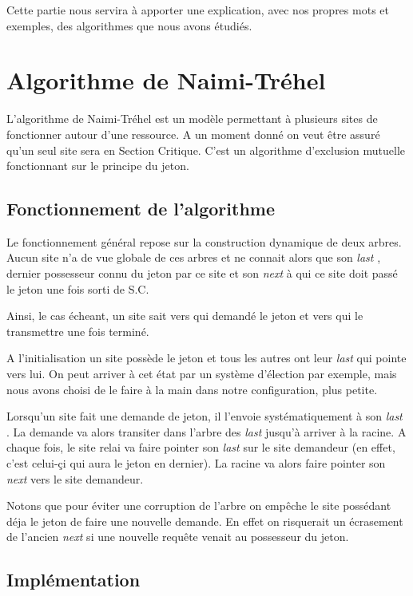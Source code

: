 \documentclass[a4paper,12pt]{report}
\newcommand{\nt}{Naimi-Tréhel }
\newcommand{\last}{\textit{last} }
\newcommand{\next}{\textit{next} }
\begin{document}
Cette partie nous servira à apporter une explication, avec nos propres mots et exemples, des algorithmes que nous avons étudiés.

\section{Algorithme de \nt}

L'algorithme de \nt est un modèle permettant à plusieurs sites de fonctionner autour d'une ressource. A un moment donné on veut être assuré qu'un seul site sera en Section Critique. C'est un algorithme d'exclusion mutuelle fonctionnant sur le principe du jeton.

\subsection*{Fonctionnement de l'algorithme}

Le fonctionnement général repose sur la construction dynamique de deux arbres. Aucun site n'a de vue globale de ces arbres et ne connait alors que son \last, dernier possesseur connu du jeton par ce site et son \next à qui ce site doit passé le jeton une fois sorti de S.C.

Ainsi, le cas écheant, un site sait vers qui demandé le jeton et vers qui le transmettre une fois terminé.

A l'initialisation un site possède le jeton et tous les autres ont leur \last qui pointe vers lui. On peut arriver à cet état par un système d'élection par exemple, mais nous avons choisi de le faire à la main dans notre configuration, plus petite.

Lorsqu'un site fait une demande de jeton, il l'envoie systématiquement à son \last. La demande va alors transiter dans l'arbre des \last jusqu'à arriver à la racine. A chaque fois, le site relai va faire pointer son \last sur le site demandeur (en effet, c'est celui-çi qui aura le jeton en dernier). La racine va alors faire pointer son \next vers le site demandeur.

Notons que pour éviter une corruption de l'arbre on empêche le site possédant déja le jeton de faire une nouvelle demande. En effet on risquerait un écrasement de l'ancien \next si une nouvelle requête venait au possesseur du jeton.


\subsection*{Implémentation}
\end{document}
